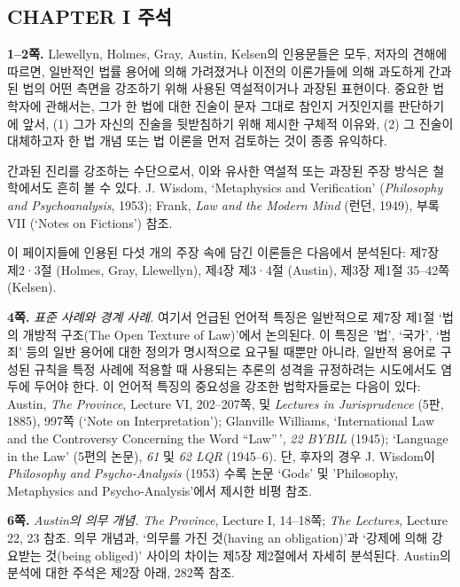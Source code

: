 \documentclass[12pt, oneside]{book}  %
\begin{document}
\subsection{\texorpdfstring{\textbf{CHAPTER I
주석}}{CHAPTER I 주석}}\label{chapter-i-uxc8fcuxc11d}

\textbf{1--2쪽.} Llewellyn, Holmes, Gray, Austin, Kelsen의 인용문들은
모두, 저자의 견해에 따르면, 일반적인 법률 용어에 의해 가려졌거나 이전의
이론가들에 의해 과도하게 간과된 법의 어떤 측면을 강조하기 위해 사용된
역설적이거나 과장된 표현이다. 중요한 법학자에 관해서는, 그가 한 법에
대한 진술이 문자 그대로 참인지 거짓인지를 판단하기에 앞서, (1) 그가
자신의 진술을 뒷받침하기 위해 제시한 구체적 이유와, (2) 그 진술이
대체하고자 한 법 개념 또는 법 이론을 먼저 검토하는 것이 종종 유익하다.

간과된 진리를 강조하는 수단으로서, 이와 유사한 역설적 또는 과장된 주장
방식은 철학에서도 흔히 볼 수 있다. J. Wisdom, `Metaphysics and
Verification' (\emph{Philosophy and Psychoanalysis}, 1953); Frank,
\emph{Law and the Modern Mind} (런던, 1949), 부록 VII (`Notes on
Fictions') 참조.

이 페이지들에 인용된 다섯 개의 주장 속에 담긴 이론들은 다음에서
분석된다: 제7장 제2·3절 (Holmes, Gray, Llewellyn), 제4장 제3·4절
(Austin), 제3장 제1절 35--42쪽 (Kelsen).

\textbf{4쪽.} \emph{표준 사례와 경계 사례.} 여기서 언급된 언어적 특징은
일반적으로 제7장 제1절 `법의 개방적 구조(The Open Texture of Law)'에서
논의된다. 이 특징은 '법', `국가', `범죄' 등의 일반 용어에 대한 정의가
명시적으로 요구될 때뿐만 아니라, 일반적 용어로 구성된 규칙을 특정 사례에
적용할 때 사용되는 추론의 성격을 규정하려는 시도에서도 염두에 두어야
한다. 이 언어적 특징의 중요성을 강조한 법학자들로는 다음이 있다: Austin,
\emph{The Province}, Lecture VI, 202--207쪽, 및 \emph{Lectures in
Jurisprudence} (5판, 1885), 997쪽 (`Note on Interpretation'); Glanville
Williams, `International Law and the Controversy Concerning the Word
``Law''\,', \emph{22 BYBIL} (1945); `Language in the Law' (5편의 논문),
\emph{61} 및 \emph{62 LQR} (1945--6). 단, 후자의 경우 J. Wisdom이
\emph{Philosophy and Psycho-Analysis} (1953) 수록 논문 `Gods' 및
'Philosophy, Metaphysics and Psycho-Analysis'에서 제시한 비평 참조.

\textbf{6쪽.} \emph{Austin의 의무 개념.} \emph{The Province}, Lecture I,
14--18쪽; \emph{The Lectures}, Lecture 22, 23 참조. 의무 개념과, `의무를
가진 것(having an obligation)'과 `강제에 의해 강요받는 것(being
obliged)' 사이의 차이는 제5장 제2절에서 자세히 분석된다. Austin의 분석에
대한 주석은 제2장 아래, 282쪽 참조.
\end{document}
